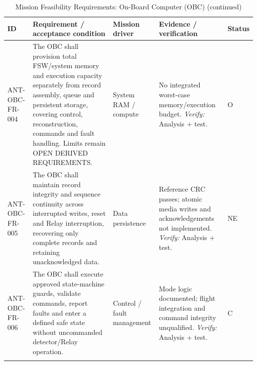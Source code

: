 \begin{table}[H]\centering\small\setlength{\tabcolsep}{3pt}
\ContinuedFloat\captionsetup{list=no}
\caption{Mission Feasibility Requirements: On-Board Computer (OBC) (continued)}
\begin{tabular}{@{}
>{\RaggedRight\arraybackslash}p{}
>{\RaggedRight\arraybackslash}p{}
>{\RaggedRight\arraybackslash}p{}
>{\RaggedRight\arraybackslash}p{}
>{\RaggedRight\arraybackslash}p{}
@{}}
\toprule ID & Requirement / acceptance condition & Mission driver & Evidence / verification & Status\\\midrule
{}\label{req:ANT-OBC-FR-004}\mbox{ANT-OBC-}\newline\mbox{FR-004} & The OBC shall provision total FSW/system memory and execution capacity separately from record assembly, queue and persistent storage, covering control, reconstruction, commands and fault handling. Limits remain OPEN DERIVED REQUIREMENTS. & System RAM / compute & No integrated worst-case memory/execution budget. \emph{Verify:} Analysis + test. & O\\
\addlinespace[3pt]
\label{req:ANT-OBC-FR-005}\mbox{ANT-OBC-}\newline\mbox{FR-005} & The OBC shall maintain record integrity and sequence continuity across interrupted writes, reset and Relay interruption, recovering only complete records and retaining unacknowledged data. & Data persistence & Reference CRC passes; atomic media writes and acknowledgements not implemented. \emph{Verify:} Analysis + test. & NE\\
\addlinespace[3pt]
\label{req:ANT-OBC-FR-006}\mbox{ANT-OBC-}\newline\mbox{FR-006} & The OBC shall execute approved state-machine guards, validate commands, report faults and enter a defined safe state without uncommanded detector/Relay operation. & Control / fault management & Mode logic documented; flight integration and command integrity unqualified. \emph{Verify:} Analysis + test. & C\\
\addlinespace[3pt]
\bottomrule
\end{tabular}
\end{table}
